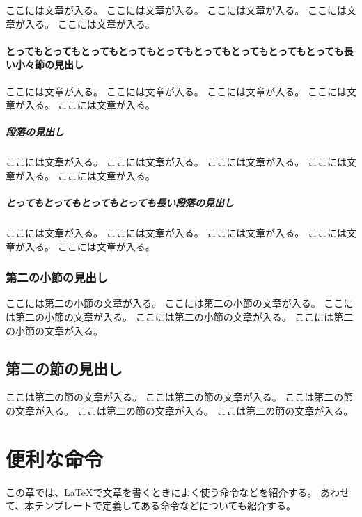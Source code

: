 \documentclass[ %
  uplatex,%
  a5paper,%
  papersize%
]{jsbook}
\begin{document}
ここには文章が入る。
ここには文章が入る。
ここには文章が入る。
ここには文章が入る。
ここには文章が入る。

\subsubsection{とってもとってもとってもとってもとってもとってもとってもとってもとっても長い小々節の見出し}

ここには文章が入る。
ここには文章が入る。
ここには文章が入る。
ここには文章が入る。
ここには文章が入る。

\paragraph{段落の見出し}

ここには文章が入る。
ここには文章が入る。
ここには文章が入る。
ここには文章が入る。
ここには文章が入る。

\paragraph{とってもとってもとってもとっても長い段落の見出し}

ここには文章が入る。
ここには文章が入る。
ここには文章が入る。
ここには文章が入る。
ここには文章が入る。

\subsection{第二の小節の見出し}

ここには第二の小節の文章が入る。
ここには第二の小節の文章が入る。
ここには第二の小節の文章が入る。
ここには第二の小節の文章が入る。
ここには第二の小節の文章が入る。

\section{第二の節の見出し}

ここは第二の節の文章が入る。
ここは第二の節の文章が入る。
ここは第二の節の文章が入る。
ここは第二の節の文章が入る。
ここは第二の節の文章が入る。

\chapter{便利な命令}

\begin{summary}
この章では、\LaTeX で文章を書くときによく使う命令などを紹介する。
あわせて、本テンプレートで定義してある命令などについても紹介する。
\end{summary}
\end{document}
